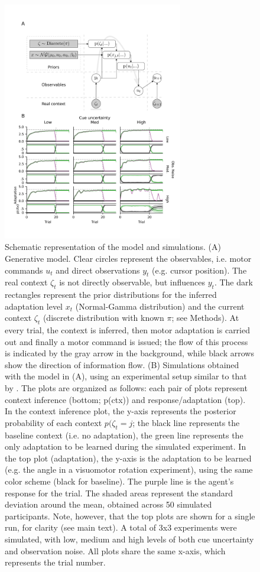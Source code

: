 \documentclass[a4paper,doc,floatsintext,natbib]{apa6}
\begin{document}
\begin{figure}
\centering
\includegraphics[width=0.7\textwidth]{./figures/figure_1.png}
\caption{Schematic representation of the model and simulations. (A) Generative model. Clear circles represent the observables, i.e. motor commands $u_t$ and direct observations $y_t$ (e.g. cursor position). The real context $\zeta_t$ is not directly observable, but influences $y_t$. The dark rectangles represent the prior distributions for the inferred adaptation level $x_t$ (Normal-Gamma distribution) and the current context $\zeta_t$ (discrete distribution with known $\pi$; see Methods). At every trial, the context is inferred, then motor adaptation is carried out and finally a motor command is issued; the flow of this process is indicated by the gray arrow in the background, while black arrows show the direction of information flow. (B) Simulations obtained with the model in (A), using an experimental setup similar to that by \cite{Davidson_Scaling_2004}. The plots are organized as follows: each pair of plots represent context inference (bottom; p(ctx)) and response/adaptation (top). In the context inference plot, the y-axis represents the posterior probability of each context $p(\zeta_t = j$; the black line represents the baseline context (i.e. no adaptation), the green line represents the only adaptation to be learned during the simulated experiment. In the top plot (adaptation), the y-axis is the adaptation to be learned (e.g. the angle in a visuomotor rotation experiment), using the same color scheme (black for baseline). The purple line is the agent's response for the trial. The shaded areas represent the standard deviation around the mean, obtained across 50 simulated participants. Note, however, that the top plots are shown for a single run, for clarity (see main text). A total of 3x3 experiments were simulated, with low, medium and high levels of both cue uncertainty and observation noise. All plots share the same x-axis, which represents the trial number.}
\label{fig:model}
\end{figure}
\end{document}
